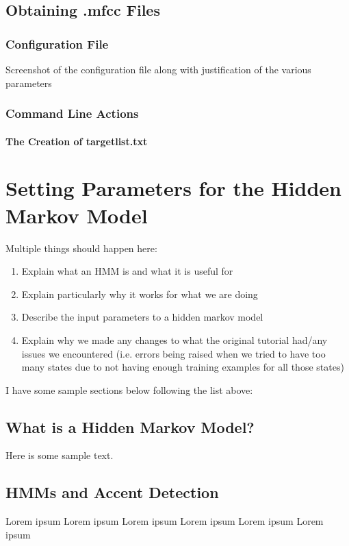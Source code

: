 \documentclass{wileySev}
\begin{document}
\section{Obtaining .mfcc Files}

\subsection{Configuration File}
Screenshot of the configuration file along with justification of the various parameters

\subsection{Command Line Actions}

\subsubsection{The Creation of targetlist.txt}


\chapter{Setting Parameters for the Hidden Markov Model}
Multiple things should happen here:
\begin{enumerate}
\item Explain what an HMM is and what it is useful for
\item Explain particularly why it works for what we are doing
\item Describe the input parameters to a hidden markov model
\item Explain why we made any changes to what the original tutorial had/any issues we encountered (i.e. errors being raised when we tried to have too many states due to not having enough training examples for all those states)
\end{enumerate}

I have some sample sections below following the list above:

\section{What is a Hidden Markov Model?}
Here is some sample text.

\section{HMMs and Accent Detection}
Lorem ipsum Lorem ipsum Lorem ipsum Lorem ipsum Lorem ipsum Lorem ipsum
\end{document}
